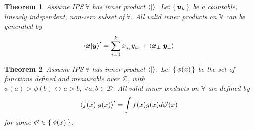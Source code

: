\documentclass{article}
\newcommand{\B}[1]{\boldsymbol{#1}}
\newcommand*\R{\mathbb{R}}
\newtheorem{theorem}{Theorem}[section]
\theoremstyle{definition}
\theoremstyle{remark}
\begin{document}
  

  
\begin{theorem}
  Assume IPS $\mathbb{V}$ has inner product $\braket{|}$. Let $\set{\B{u}_k}$ be a countable,
  linearly independent, non-zero subset of $\mathbb{V}$. All valid inner products 
  on $\mathbb{V}$ can be generated by 
  \begin{equation}
    \braket{\B{x}|\B{y}}^\prime = \sum_{i=0}^k x_{u_i} y_{u_i} + \braket{\B{x}_\perp |\B{y}_\perp}
  \end{equation}
\end{theorem}

\begin{theorem}
  Assume IPS $\mathbb{V}$ has inner product $\braket{|}$. 
  Let $\set{\phi(x)}$ be the set of functions defined and measurable over $\mathcal{D}$, with 
  $\phi(a) > \phi(b) \leftrightarrow a > b, ~ \forall a, b \in \mathcal{D}$.
  All valid inner products on $\mathbb{V}$ are defined by 
  \begin{equation}
    \braket{f(x)|g(x)}^\prime = \int f(x) g(x) d \phi^\prime(x)  
  \end{equation}
  for some $\phi^\prime \in \set{\phi(x)}$.
\end{theorem}
\end{document}

